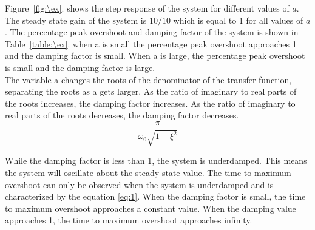 Figure~\ref{fig:\ex}. shows the step response of the system for different values of $a$. The steady state gain of the system is $10/10$ which is equal to 1 for all values of $a$. The percentage peak overshoot and damping factor of the system is shown in Table~\ref{table:\ex}. when a is small the percentage peak overshoot approaches 1 and the damping factor is small. When a is large, the percentage peak overshoot is small and the damping factor is large. \\

The variable a changes the roots of the denominator of the transfer function, separating the roots as a gets larger. As the ratio of imaginary to real parts of the roots increases, the damping factor increases. As the ratio of imaginary to real parts of the roots decreases, the damping factor decreases. \\

\begin{equation}
    \frac{\pi}{\omega_0\sqrt{1-\xi^2}}
    \label{eq:1}
\end{equation}

While the damping factor is less than 1, the system is underdamped. This means the system will oscillate about the steady state value. The time to maximum overshoot can only be observed when the system is underdamped and is characterized by the equation \eqref{eq:1}. When the damping factor is small, the time to maximum overshoot approaches a constant value. When the damping value approaches 1, the time to maximum overshoot approaches infinity.\\



